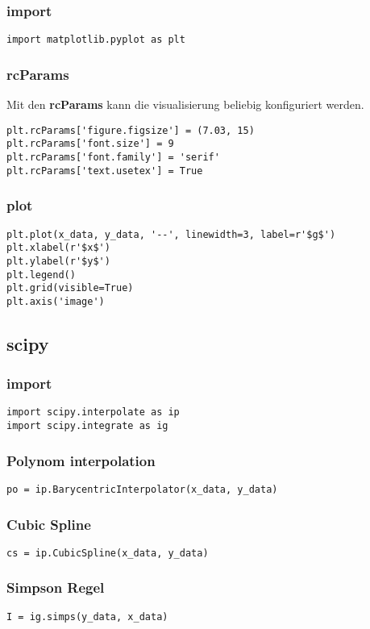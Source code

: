 \subsubsection{import}

\begin{verbatim}
import matplotlib.pyplot as plt
\end{verbatim}

\subsubsection{rcParams}

Mit den \textbf{rcParams} kann die visualisierung beliebig konfiguriert werden.

\begin{verbatim}
plt.rcParams['figure.figsize'] = (7.03, 15)
plt.rcParams['font.size'] = 9
plt.rcParams['font.family'] = 'serif'
plt.rcParams['text.usetex'] = True
\end{verbatim}

\subsubsection{plot}

\begin{verbatim}
plt.plot(x_data, y_data, '--', linewidth=3, label=r'$g$')
plt.xlabel(r'$x$')
plt.ylabel(r'$y$')
plt.legend()
plt.grid(visible=True)
plt.axis('image')
\end{verbatim}

\subsection{scipy}

\subsubsection{import}

\begin{verbatim}
import scipy.interpolate as ip
import scipy.integrate as ig
\end{verbatim}

\subsubsection{Polynom interpolation}

\begin{verbatim}
po = ip.BarycentricInterpolator(x_data, y_data)
\end{verbatim}

\subsubsection{Cubic Spline}

\begin{verbatim}
cs = ip.CubicSpline(x_data, y_data)
\end{verbatim}

\subsubsection{Simpson Regel}

\begin{verbatim}
I = ig.simps(y_data, x_data)
\end{verbatim}